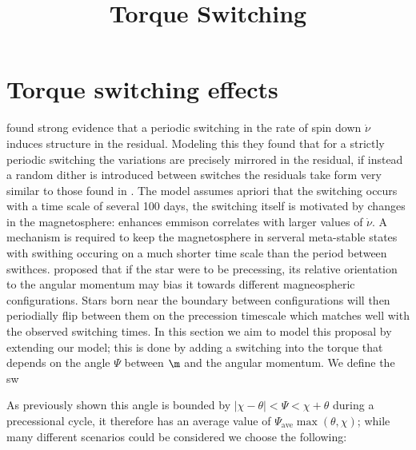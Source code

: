 \documentclass[/home/greg/Thesis/main/main.tex]{subfiles}
\title{Torque Switching}
\author{}
\begin{document}
\graphicspath{{/home/greg/Neutron_star_modelling/TimingNoiseModels/TorqueSwitching/img/}}


\maketitle

\section{Torque switching effects}

\citet{Lyne2010} found strong evidence that a periodic switching in the rate of
spin down $\dot\nu$ induces structure in the residual. Modeling this they found
that for a strictly periodic switching the variations are precisely mirrored in
the residual, if instead a random dither is introduced between switches the
residuals take form very similar to those found in \citet{Hobbs2010}. The model
assumes apriori that the switching occurs with a time scale of several 100
days, the switching itself is motivated by changes in the magnetosphere:
enhances emmison correlates with larger values of $\dot\nu$. A mechanism is
required to keep the magnetosphere in serveral meta-stable states with swithing
occuring on a much shorter time scale than the period between swithces.
\citet{Jones2010} %
proposed that if the star were to be precessing, its relative orientation to
the angular momentum may bias it towards different magneospheric
configurations. Stars born near the boundary between configurations will then
periodially flip between them on the precession timescale which matches well
with the observed switching times. In this section we aim to model this
proposal by extending our model; this is done by adding a switching into the
torque that depends on the angle $\Psi $ between $\m$ and the angular
momentum. We define the sw

As previously shown this angle is bounded by $|\chi - \theta| < \Psi
< \chi + \theta$ during a precessional cycle, it therefore has an average
value of $\Psi_{\textrm{ave}}\max(\theta, \chi)$; while many different
scenarios could be considered we choose the following: 
\end{document}
